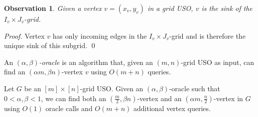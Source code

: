 \documentclass[runningheads,a4paper]{llncs}
\newtheorem{observation}{Observation}
\begin{document}
\begin{observation}\label{Obs:Sink of dominated grid}
Given a vertex  $v = (x_v, y_v)$ in a grid USO, $v$ is the sink of the $I_v\times J_v$-grid.
\end{observation}
\begin{proof}
Vertex $v$ has only incoming edges in the $I_v\times J_v$-grid and is therefore the unique sink of this subgrid. \qed
\end{proof}

An \emph{$(\alpha, \beta)$-oracle} is an algorithm that, given an $(m, n)$-grid USO as input, can find an $(\alpha m, \beta n)$-vertex $v$ using $O(m + n)$ queries.

\begin{lemma}\label{lemma:Climbing lemma}
Let $G$ be an $[m]\times [n]$-grid USO.
Given an $(\alpha, \beta)$-oracle such that $0 < \alpha, \beta  < 1$, we can find both an $(\frac{m}{2}, \beta n)$-vertex and an $(\alpha m, \frac{n}{2})$-vertex in $G$ using $O(1)$ oracle calls and $O(m+n)$ additional vertex queries.
\end{lemma}
\end{document}
